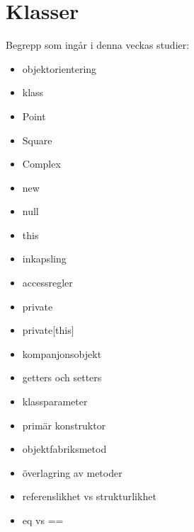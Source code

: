 \chapter{Klasser}\label{chapter:W05}
Begrepp som ingår i denna veckas studier:
\begin{itemize}[noitemsep,label={$\square$},leftmargin=*]
\item objektorientering
\item klass
\item Point
\item Square
\item Complex
\item new
\item null
\item this
\item inkapsling
\item accessregler
\item private
\item private[this]
\item kompanjonsobjekt
\item getters och setters
\item klassparameter
\item primär konstruktor
\item objektfabriksmetod
\item överlagring av metoder
\item referenslikhet vs strukturlikhet
\item eq vs ==\end{itemize}
